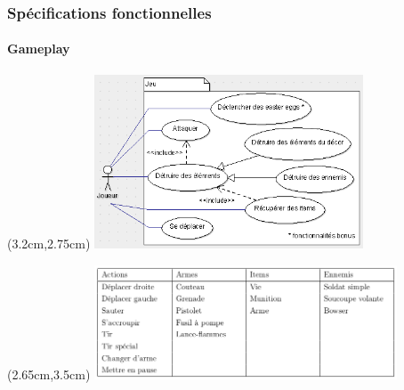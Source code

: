 \begin{frame}

	\frametitle{Spécifications fonctionnelles}
	\framesubtitle{Gameplay}
	
	{
		\begin{textblock*}{8cm}(3.2cm,2.75cm)
			\includegraphics[width=8cm]{figures/use_case_metal_slug_gameplay.png}
		\end{textblock*}
	}
	{
		\begin{textblock*}{9cm}(2.65cm,3.5cm)
			\includegraphics[width=9cm]{figures/tableau_gameplay.png}
		\end{textblock*}
	}
	
\end{frame}
